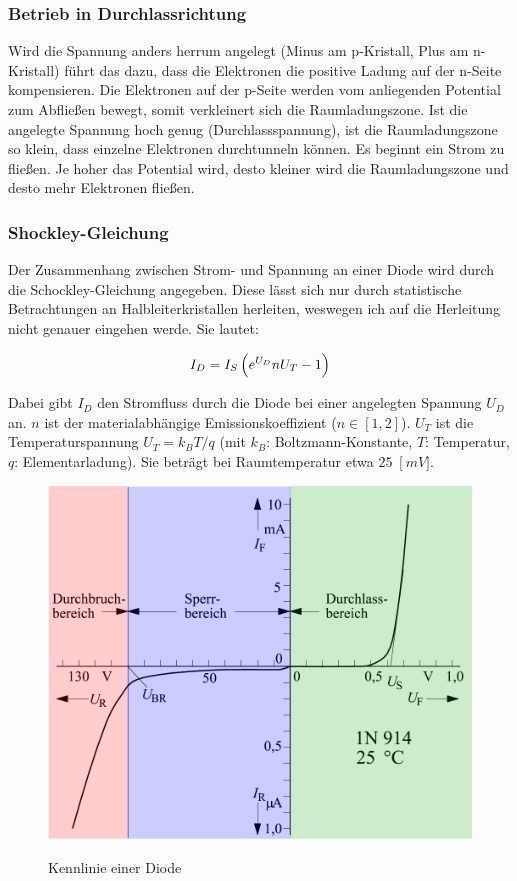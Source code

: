 \subsubsection{Betrieb in Durchlassrichtung}

Wird die Spannung anders herrum angelegt (Minus am p-Kristall, Plus am
n-Kristall) führt das dazu, dass die Elektronen die positive Ladung auf der
n-Seite kompensieren. Die Elektronen auf der p-Seite werden vom anliegenden
Potential zum Abfließen bewegt, somit verkleinert sich die Raumladungszone. Ist
die angelegte Spannung hoch genug (Durchlassspannung), ist die Raumladungszone
so klein, dass einzelne Elektronen durchtunneln können. Es beginnt ein Strom zu
fließen. Je hoher das Potential wird, desto kleiner wird die Raumladungszone
und desto mehr Elektronen fließen.

\subsubsection{Shockley-Gleichung}

Der Zusammenhang zwischen Strom- und Spannung an einer Diode wird durch die
Schockley-Gleichung angegeben. Diese lässt sich nur durch statistische
Betrachtungen an Halbleiterkristallen herleiten, weswegen ich auf die
Herleitung nicht genauer eingehen werde. Sie lautet:

\begin{equation}
  I_D = I_S \del{e^{U_D}{n U_T} - 1}
\end{equation}

Dabei gibt $I_D$ den Stromfluss durch die Diode bei einer angelegten Spannung
$U_D$ an. $n$ ist der materialabhängige Emissionskoeffizient ($n \in [1,2]$).
$U_T$ ist die Temperaturspannung $U_T = k_B T/q$ (mit $k_B$:
Boltzmann-Konstante, $T$: Temperatur, $q$: Elementarladung). Sie beträgt bei
Raumtemperatur etwa $25 \;\operatorname[mV]$.

\begin{figure}[H]
  \centering
  \includegraphics[width=.6\textwidth]{kennlinie.pdf}
  \label{img:kennlinie}
  \caption{Kennlinie einer Diode}
\end{figure}

